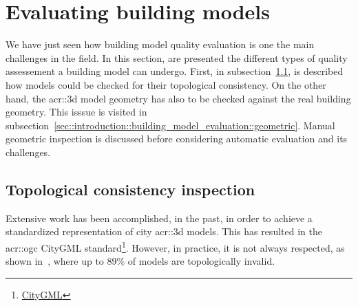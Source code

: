 \section{Evaluating building models}
    \label{sec::introduction::building_model_evaluation}
    We have just seen how building model quality evaluation is one the main challenges in the field.
    In this section, are presented the different types of quality assessement a building model can undergo.
    First, in subsection~\ref{sec::introduction::building_model_evaluation::topological}, is described how models could be checked for their topological consistency.
    On the other hand, the \gls{acr::3d} model geometry has also to be checked against the real building geometry.
    This isssue is visited in subsection~\ref{sec::introduction::building_model_evaluation::geometric}.
    Manual geometric inspection is discussed before considering automatic evaluation and its challenges.

    \subsection{Topological consistency inspection}
        \label{sec::introduction::building_model_evaluation::topological}
        Extensive work has been accomplished, in the past, in order to achieve a standardized representation of city \gls{acr::3d} models.
        This has resulted in the \gls{acr::ogc} CityGML standard\footnote{\href{https://www.opengeospatial.org/standards/citygml}{CityGML}}.
        However, in practice, it is not always respected, as shown in~\textcite{biljecki2016most}, where up to 89\% of models are topologically invalid.\\

